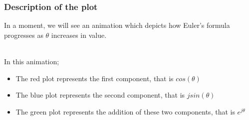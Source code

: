 \begin{frame}[t]

	\frametitle{Description of the plot}

	In a moment, we will see an animation which depicts how Euler's formula progresses as \(\theta\) increases in value.\\~

	In this animation;

	\begin{itemize}
		\item   The red plot represents the first component, that is \(cos(\theta)\)
		\item   The blue plot represents the second component, that is \(jsin(\theta)\)
		\item   The green plot represents the addition of these two components, that is \(e^{j\theta}\)
	\end{itemize}

\end{frame}
